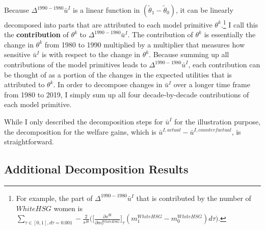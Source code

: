 Because $\Delta^{1990-1980}\bar{u}^I$ is a linear function in $(\tilde{\theta}_1 - \tilde{\theta}_0)$, it can be linearly decomposed into parts that are attributed to each model primitive $\theta^k$.\footnote{For example, the part of $\Delta^{1990-1980}\bar{u}^I$ that is contributed by the number of $WhiteHSG$ women is $\sum_{\tau \in [0,1], d\tau = 0.001} -  \frac{2}{s^{I\emptyset}} \Big(  \Big[\frac{\partial s^{I\emptyset} }{\partial m^{WhiteHSG}_\tau} \Big]_\tau (m^{WhiteHSG}_1 - m^{WhiteHSG}_0)d\tau  \Big)$.} I call this the \textbf{contribution} of $\theta^k$ to $\Delta^{1990-1980}\bar{u}^I$. The contribution of $\theta^k$ is essentially the change in $\theta^k$ from 1980 to 1990 multiplied by a multiplier that measures how sensitive $\bar{u}^I$ is with respect to the change in $\theta^k$. Because summing up all contributions of the model primitives leads to $\Delta^{1990-1980}\bar{u}^I$, each contribution can be thought of as a portion of the changes in the expected utilities that is attributed to $\theta^k$. In order to decompose changes in $\bar{u}^I$ over a longer time frame from 1980 to 2019, I simply sum up all four decade-by-decade contributions of each model primitive.

\vspace{2mm}

While I only described the decomposition steps for $\bar{u}^I$ for the illustration purpose, the decomposition for the welfare gains, which is $\bar{u}^{I, actual} - \bar{u}^{I, counterfactual}$, is straightforward. 


\subsection{Additional Decomposition Results }

